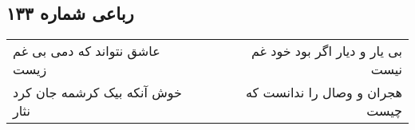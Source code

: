\begin{center}
\section*{رباعی شماره ۱۳۳}
\label{sec:sh133}
\begin{longtable}{l p{0.5cm} r}
عاشق نتواند که دمی بی غم زیست
&&
بی یار و دیار اگر بود خود غم نیست
\\
خوش آنکه بیک کرشمه جان کرد نثار
&&
هجران و وصال را ندانست که چیست
\\
\end{longtable}
\end{center}
